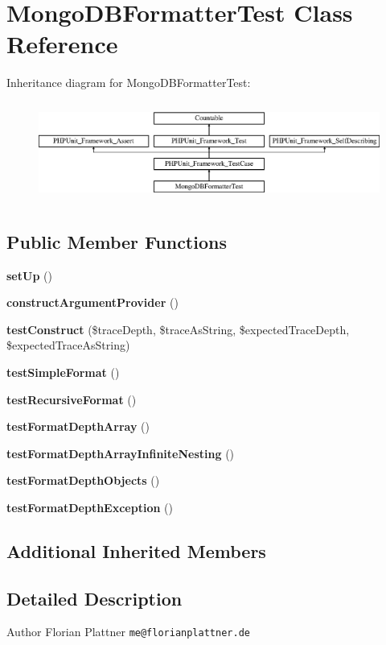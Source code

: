 \section{Mongo\+D\+B\+Formatter\+Test Class Reference}
\label{class_monolog_1_1_formatter_1_1_mongo_d_b_formatter_test}
Inheritance diagram for Mongo\+D\+B\+Formatter\+Test\+:\begin{figure}[H]
\begin{center}
\leavevmode
\includegraphics[height=3.303835cm]{class_monolog_1_1_formatter_1_1_mongo_d_b_formatter_test}
\end{center}
\end{figure}
\subsection*{Public Member Functions}
\begin{DoxyCompactItemize}
\item 
{\bf set\+Up} ()
\item 
{\bf construct\+Argument\+Provider} ()
\item 
{\bf test\+Construct} (\$trace\+Depth, \$trace\+As\+String, \$expected\+Trace\+Depth, \$expected\+Trace\+As\+String)
\item 
{\bf test\+Simple\+Format} ()
\item 
{\bf test\+Recursive\+Format} ()
\item 
{\bf test\+Format\+Depth\+Array} ()
\item 
{\bf test\+Format\+Depth\+Array\+Infinite\+Nesting} ()
\item 
{\bf test\+Format\+Depth\+Objects} ()
\item 
{\bf test\+Format\+Depth\+Exception} ()
\end{DoxyCompactItemize}
\subsection*{Additional Inherited Members}


\subsection{Detailed Description}
\begin{DoxyAuthor}{Author}
Florian Plattner {\tt me@florianplattner.\+de} 
\end{DoxyAuthor}


